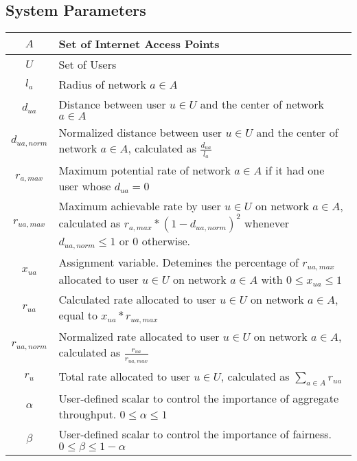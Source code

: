 \documentclass[11pt]{article}
\begin{document}
\subsection{System Parameters}
\begin{center}
\renewcommand\arraystretch{1.3}
\begin{tabular}{| c | p{12cm} |}
\hline
$A$ & Set of Internet Access Points \\ 
\hline
$U$ & Set of Users \\ 
\hline
$l_a$ & Radius of network $a \in A$ \\
\hline
$d_{ua}$ & Distance between user $u \in U$ and the center of network $a \in A$ \\ 
\hline
$d_{ua,norm}$ & Normalized distance between user $u \in U$ and the center of network $a \in A$, calculated as $\displaystyle\frac{d_{ua}}{l_a}$ \\[8pt] 
\hline
$r_{a,max}$ & Maximum potential rate of network $a \in A$ if it had one user whose $d_{ua} = 0$ \\ 
\hline
$r_{ua,max}$ & Maximum achievable rate by user $u \in U$ on network $a \in A$, calculated as $r_{a,max} * (1 - d_{ua,norm})^2$ whenever $d_{ua,norm} \leq 1$ or 0 otherwise. \\[8pt] 
\hline
$x_{ua}$ & Assignment variable. Detemines the percentage of $r_{ua,max}$ allocated to user $u \in U$ on network $a \in A$ with $0 \leq x_{ua} \leq 1$ \\ 
\hline
$r_{ua}$ & Calculated rate allocated to user $u \in U$ on network $a \in A$, equal to $x_{ua} * r_{ua,max}$ \\ 
\hline
$r_{ua,norm}$ & Normalized rate allocated to user $u \in U$ on network $a \in A$, calculated as $\displaystyle\frac{r_{ua}}{r_{ua,max}}$ \\[8pt] 
\hline
$r_{u}$ & Total rate allocated to user $u \in U$, calculated as $\sum_{a \in A} r_{ua}$ \\ 
\hline
$\alpha$ & User-defined scalar to control the importance of aggregate throughput. $0 \leq \alpha \leq 1$ \\
\hline
$\beta$ & User-defined scalar to control the importance of fairness. $0 \leq \beta \leq 1 - \alpha$ \\
\hline
\end{tabular}
\end{center}
\pagebreak
\end{document}
